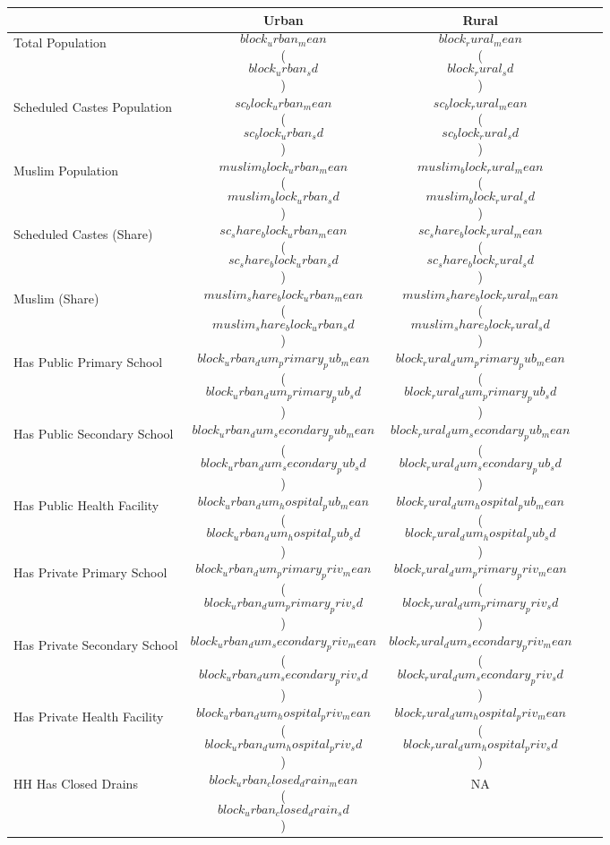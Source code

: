 {
  \def\sym#1{\ifmmode^{#1}\else\(^{#1}\)\fi}
\begin{tabular}{lcccc}
  \hline\hline
  & \multicolumn{1}{c}{Urban} & \multicolumn{1}{c}{Rural} \\
  \hline
  Total Population  & $$block_urban_mean$$ ($$block_urban_sd$$)  & $$block_rural_mean$$ ($$block_rural_sd$$) \\
  Scheduled Castes Population  & $$sc_block_urban_mean$$ ($$sc_block_urban_sd$$)   & $$sc_block_rural_mean$$ ($$sc_block_rural_sd$$)   \\
  Muslim Population  & $$muslim_block_urban_mean$$ ($$muslim_block_urban_sd$$)   & $$muslim_block_rural_mean$$ ($$muslim_block_rural_sd$$)   \\
  Scheduled Castes (Share)  & $$sc_share_block_urban_mean$$  ($$sc_share_block_urban_sd$$)   & $$sc_share_block_rural_mean$$  ($$sc_share_block_rural_sd$$)   \\
  Muslim (Share)  & $$muslim_share_block_urban_mean$$ ($$muslim_share_block_urban_sd$$)   & $$muslim_share_block_rural_mean$$ ($$muslim_share_block_rural_sd$$)    \\
  Has Public Primary School & $$block_urban_dum_primary_pub_mean$$ ($$block_urban_dum_primary_pub_sd$$)  & $$block_rural_dum_primary_pub_mean$$ ($$block_rural_dum_primary_pub_sd$$) \\
  Has Public Secondary School & $$block_urban_dum_secondary_pub_mean$$ ($$block_urban_dum_secondary_pub_sd$$)  & $$block_rural_dum_secondary_pub_mean$$ ($$block_rural_dum_secondary_pub_sd$$) \\
  Has Public Health Facility & $$block_urban_dum_hospital_pub_mean$$ ($$block_urban_dum_hospital_pub_sd$$)  & $$block_rural_dum_hospital_pub_mean$$ ($$block_rural_dum_hospital_pub_sd$$) \\
  Has Private Primary School & $$block_urban_dum_primary_priv_mean$$ ($$block_urban_dum_primary_priv_sd$$)  & $$block_rural_dum_primary_priv_mean$$ ($$block_rural_dum_primary_priv_sd$$) \\
  Has Private Secondary School & $$block_urban_dum_secondary_priv_mean$$ ($$block_urban_dum_secondary_priv_sd$$)  & $$block_rural_dum_secondary_priv_mean$$ ($$block_rural_dum_secondary_priv_sd$$) \\
  Has Private Health Facility & $$block_urban_dum_hospital_priv_mean$$ ($$block_urban_dum_hospital_priv_sd$$)  & $$block_rural_dum_hospital_priv_mean$$ ($$block_rural_dum_hospital_priv_sd$$) \\
  HH Has Closed Drains &  $$block_urban_closed_drain_mean$$ ($$block_urban_closed_drain_sd$$) & NA  \\

\end{tabular}}
